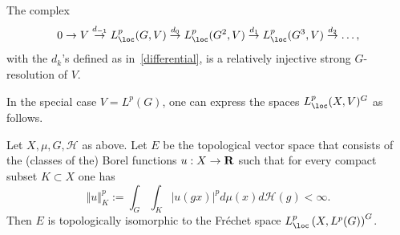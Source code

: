 \begin{lemm}[\cite{Bl}]\label{Blanc_lemma}
The complex 
\[
0 \to V \stackrel{d_{-1}}{\to} L_{\loc}^p(G, V) \stackrel{d_0}{\to} L_{\loc}^p(G^2, V)
\stackrel{d_1}{\to} L_{\loc}^p(G^3, V) \stackrel{d_2}{\to}\dots,
\]
with the $d_k$'s defined as in~\eqref{differential}, is a relatively injective strong $G$-resolution of $V$.
\end{lemm}

In the special case $V = L^p(G)$, one can express the spaces $L_{\loc}^p(X, V)^G$ as follows.

\begin{lemm}\label{cont_asymp_lemma}
Let $X,\mu, G, \mathcal H$ as above. Let
$E$ be the topological vector space that consists of the (classes of the) Borel functions $u: X \to {\bf R}$ such that for every compact subset $K \subset X$ one has
\[
\Vert u \Vert _K ^p:= \int_G \int_K \vert u(gx) \vert^p d\mu(x)d\mathcal H (g) < \infty.
\]
Then $E$ is topologically isomorphic to the Fréchet space $L_{\loc}^p\left(X, L^p(G)\right)^G$.
\end{lemm}

